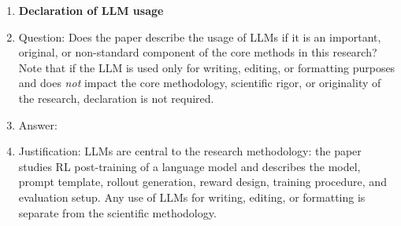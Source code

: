 \begin{enumerate}
\item {\bf Declaration of LLM usage}
    \item[] Question: Does the paper describe the usage of LLMs if it is an important, original, or non-standard component of the core methods in this research? Note that if the LLM is used only for writing, editing, or formatting purposes and does \emph{not} impact the core methodology, scientific rigor, or originality of the research, declaration is not required.
    \item[] Answer: \answerYes{}
    \item[] Justification: LLMs are central to the research methodology: the paper studies RL post-training of a language model and describes the model, prompt template, rollout generation, reward design, training procedure, and evaluation setup. Any use of LLMs for writing, editing, or formatting is separate from the scientific methodology.

\end{enumerate}